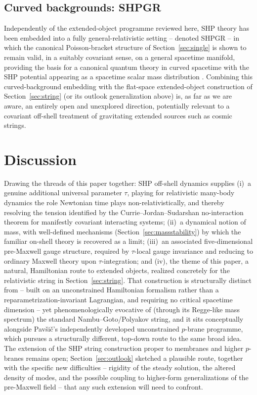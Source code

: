 \documentclass[11pt]{article}
\begin{document}
\subsection{Curved backgrounds: SHPGR}

Independently of the extended-object programme reviewed here, SHP theory has
been embedded into a fully general-relativistic setting -- denoted SHPGR -- in
which the canonical Poisson-bracket structure of Section~\ref{sec:single} is
shown to remain valid, in a suitably covariant sense, on a general spacetime
manifold, providing the basis for a canonical quantum theory in curved
spacetime with the SHP potential appearing as a spacetime scalar mass
distribution \cite{Horwitz2019GR}. Combining this curved-background embedding
with the flat-space extended-object construction of Section~\ref{sec:string}
(or its outlook generalization above) is, as far as we are aware, an entirely
open and unexplored direction, potentially relevant to a covariant off-shell
treatment of gravitating extended sources such as cosmic strings.


\section{Discussion}
\label{sec:discussion}

Drawing the threads of this paper together: SHP off-shell dynamics supplies
(i)~a genuine additional universal parameter $\tau$, playing for relativistic
many-body dynamics the role Newtonian time plays non-relativistically, and
thereby resolving the tension identified by the Currie--Jordan--Sudarshan
no-interaction theorem for manifestly covariant interacting systems;
(ii)~a dynamical notion of mass, with well-defined mechanisms
(Section~\ref{sec:massstability}) by which the familiar on-shell theory is
recovered as a limit; (iii)~an associated five-dimensional pre-Maxwell gauge
structure, required by $\tau$-local gauge invariance and reducing to ordinary
Maxwell theory upon $\tau$-integration; and (iv), the theme of this paper, a
natural, Hamiltonian route to extended objects, realized concretely for the
relativistic string in Section~\ref{sec:string}. That construction is
structurally distinct from -- built on an unconstrained Hamiltonian formalism
rather than a reparametrization-invariant Lagrangian, and requiring no
critical spacetime dimension -- yet phenomenologically evocative of (through
its Regge-like mass spectrum) the standard Nambu--Goto/Polyakov string, and it
sits conceptually alongside Pavši\v{c}'s independently developed unconstrained
$p$-brane programme, which pursues a structurally different, top-down route to
the same broad idea. The extension of the SHP string construction proper to
membranes and higher $p$-branes remains open; Section~\ref{sec:outlook}
sketched a plausible route, together with the specific new difficulties --
rigidity of the steady solution, the altered density of modes, and the
possible coupling to higher-form generalizations of the pre-Maxwell field --
that any such extension will need to confront.
\end{document}
